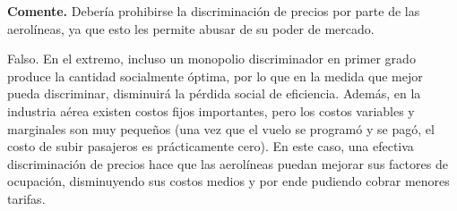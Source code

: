 \question \textbf{Comente.} Debería prohibirse la discriminación de precios por parte de las aerolíneas, ya que esto les permite abusar de su poder de mercado.
\begin{solution}
Falso. En el extremo, incluso un monopolio discriminador en primer grado produce la cantidad socialmente óptima, por lo que en la medida que mejor pueda discriminar, disminuirá la pérdida social de eficiencia. Además, en la industria aérea existen costos fijos importantes, pero los costos variables y marginales son muy pequeños (una vez que el vuelo se programó y se pagó, el costo de subir pasajeros es prácticamente cero). En este caso, una efectiva discriminación de precios hace que las aerolíneas puedan mejorar sus factores de ocupación, disminuyendo sus costos medios y por ende pudiendo cobrar menores tarifas.

\end{solution}

